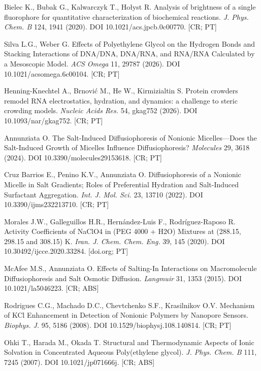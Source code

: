 \documentclass[10pt,a4paper]{article}
\begin{document}
\begin{enumerate}[label={[\arabic*]},ref={\arabic*},leftmargin=*,itemsep=0pt]
\item\label{b:bielec20} Bielec K., Bubak G., Kalwarczyk T., Hołyst R. Analysis of brightness of a single fluorophore for quantitative characterization of biochemical reactions. \emph{J. Phys. Chem. B} 124, 1941 (2020). DOI 10.1021/acs.jpcb.0c00770. [CR; PT]
\item\label{b:silva} Silva L.G., Weber G. Effects of Polyethylene Glycol on the Hydrogen Bonds and Stacking Interactions of DNA/DNA, DNA/RNA, and RNA/RNA Calculated by a Mesoscopic Model. \emph{ACS Omega} 11, 29787 (2026). DOI 10.1021/acsomega.6c00104. [CR; PT]
\item\label{b:hk26} Henning-Knechtel A., Brnović M., He W., Kirmizialtin S. Protein crowders remodel RNA electrostatics, hydration, and dynamics: a challenge to steric crowding models. \emph{Nucleic Acids Res.} 54, gkag752 (2026). DOI 10.1093/nar/gkag752. [CR; PT]
\item\label{b:annun24} Annunziata O. The Salt-Induced Diffusiophoresis of Nonionic Micelles---Does the Salt-Induced Growth of Micelles Influence Diffusiophoresis? \emph{Molecules} 29, 3618 (2024). DOI 10.3390/molecules29153618. [CR; PT]
\item\label{b:cruz} Cruz Barrios E., Penino K.V., Annunziata O. Diffusiophoresis of a Nonionic Micelle in Salt Gradients; Roles of Preferential Hydration and Salt-Induced Surfactant Aggregation. \emph{Int. J. Mol. Sci.} 23, 13710 (2022). DOI 10.3390/ijms232213710. [CR; PT]
\item\label{b:morales20} Morales J.W., Galleguillos H.R., Hernández-Luis F., Rodríguez-Raposo R. Activity Coefficients of NaClO4 in (PEG 4000 + H2O) Mixtures at (288.15, 298.15 and 308.15) K. \emph{Iran. J. Chem. Chem. Eng.} 39, 145 (2020). DOI 10.30492/ijcce.2020.33284. [doi.org; PT]
\item\label{b:mcafee15} McAfee M.S., Annunziata O. Effects of Salting-In Interactions on Macromolecule Diffusiophoresis and Salt Osmotic Diffusion. \emph{Langmuir} 31, 1353 (2015). DOI 10.1021/la5046223. [CR; ABS]
\item\label{b:rodrigues} Rodrigues C.G., Machado D.C., Chevtchenko S.F., Krasilnikov O.V. Mechanism of KCl Enhancement in Detection of Nonionic Polymers by Nanopore Sensors. \emph{Biophys. J.} 95, 5186 (2008). DOI 10.1529/biophysj.108.140814. [CR; PT]
\item\label{b:ohki} Ohki T., Harada M., Okada T. Structural and Thermodynamic Aspects of Ionic Solvation in Concentrated Aqueous Poly(ethylene glycol). \emph{J. Phys. Chem. B} 111, 7245 (2007). DOI 10.1021/jp071666j. [CR; ABS]

\end{enumerate}
\end{document}
